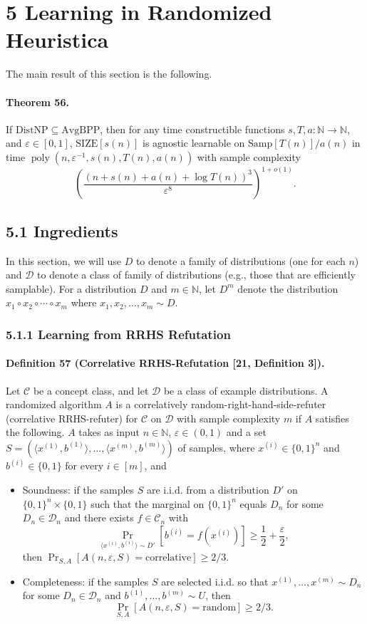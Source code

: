 \documentclass[10pt,a4paper]{article}
\begin{document}
\section*{5 Learning in Randomized Heuristica}
The main result of this section is the following.

\paragraph{Theorem 56.} If $\mathrm{DistNP}\subseteq\mathrm{AvgBPP}$, then for any time constructible functions $s,T,a:\mathbb N\to\mathbb N$, and $\varepsilon\in[0,1]$, $\mathrm{SIZE}[s(n)]$ is agnostic learnable on $\mathrm{Samp}[T(n)]/a(n)$ in time $\operatorname{poly}(n,\varepsilon^{-1},s(n),T(n),a(n))$ with sample complexity
\[\left(\frac{(n+s(n)+a(n)+\log T(n))^3}{\varepsilon^8}\right)^{1+o(1)}.\]

\subsection*{5.1 Ingredients}
In this section, we will use $D$ to denote a family of distributions (one for each $n$) and $\mathcal D$ to denote a class of family of distributions (e.g., those that are efficiently samplable). For a distribution $D$ and $m\in\mathbb N$, let $D^m$ denote the distribution $x_1\circ x_2\circ\cdots\circ x_m$ where $x_1,x_2,\ldots,x_m\sim D$.
\subsubsection*{5.1.1 Learning from RRHS Refutation}
\paragraph{Definition 57 (Correlative RRHS-Refutation [21, Definition 3]).} Let $\mathcal C$ be a concept class, and let $\mathcal D$ be a class of example distributions. A randomized algorithm $A$ is a correlatively random-right-hand-side-refuter (correlative RRHS-refuter) for $\mathcal C$ on $\mathcal D$ with sample complexity $m$ if $A$ satisfies the following. $A$ takes as input $n\in\mathbb N$, $\varepsilon\in(0,1)$ and a set $S=(\langle x^{(1)},b^{(1)}\rangle,\ldots,\langle x^{(m)},b^{(m)}\rangle)$ of samples, where $x^{(i)}\in\{0,1\}^n$ and $b^{(i)}\in\{0,1\}$ for every $i\in[m]$, and
\begin{itemize}
\item Soundness: if the samples $S$ are i.i.d. from a distribution $D'$ on $\{0,1\}^n\times\{0,1\}$ such that the marginal on $\{0,1\}^n$ equals $D_n$ for some $D_n\in\mathcal D_n$ and there exists $f\in\mathcal C_n$ with
\[\Pr_{\langle x^{(i)},b^{(i)}\rangle\sim D'}[b^{(i)}=f(x^{(i)})]\geq\frac12+\frac\varepsilon2,\]
then $\Pr_{S,A}[A(n,\varepsilon,S)=\text{correlative}]\geq2/3$.
\item Completeness: if the samples $S$ are selected i.i.d. so that $x^{(1)},\ldots,x^{(m)}\sim D_n$ for some $D_n\in\mathcal D_n$ and $b^{(1)},\ldots,b^{(m)}\sim U$, then
\[\Pr_{S,A}[A(n,\varepsilon,S)=\text{random}]\geq2/3.\]
\end{itemize}
\end{document}
